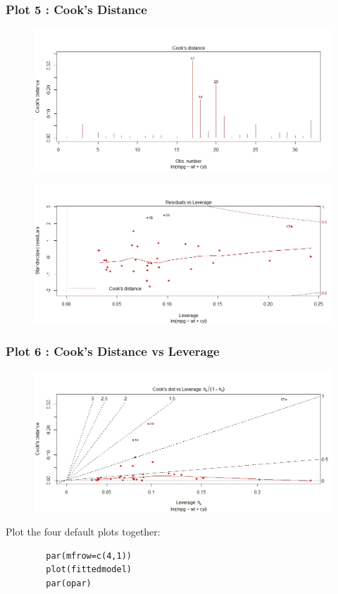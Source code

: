 \documentclass[residuals.tex]{subfiles}
\begin{document}
	\bigskip
	\subsubsection*{Plot 5 :  Cook's Distance}
	\begin{figure}[h!]
		\centering
		\includegraphics[width=0.95\linewidth]{./mtcarsDiagPlot4}
		
		\label{mtcarsDiagPlot4}
	\end{figure}
	
	\bigskip
	
	\begin{figure}[h!]
		\centering
		\includegraphics[width=0.9\linewidth]{./mtcarsDiagPlot5}
		
		\label{mtcarsDiagPlot5}
	\end{figure}
	\bigskip
	
	\subsubsection*{Plot 6 :  Cook's Distance vs Leverage}
	\begin{figure}[h!]
		\centering
		\includegraphics[width=0.95\linewidth]{./mtcarsDiagPlot6}
		
		\label{mtcarsDiagPlot6}
	\end{figure}
	
	\bigskip
	Plot the four default plots together:
	\begin{framed}
		\begin{verbatim}
		par(mfrow=c(4,1))
		plot(fittedmodel)
		par(opar)
		\end{verbatim}
	\end{framed}
	
	
\end{document}
